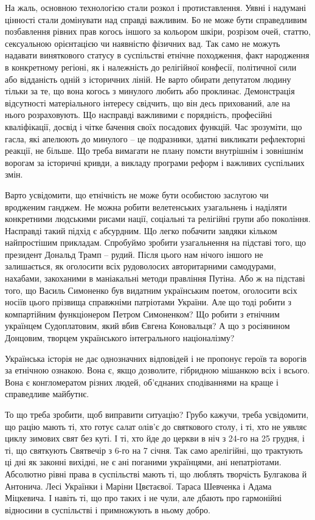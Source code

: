На жаль, основною технологією стали розкол і протиставлення. Уявні і надумані
цінності стали домінувати над справді важливим. Бо не може бути справедливим
позбавлення рівних прав когось іншого за кольором шкіри, розрізом очей, статтю,
сексуальною орієнтацією чи наявністю фізичних вад. Так само не можуть надавати
виняткового статусу в суспільстві етнічне походження, факт народження в
конкретному регіоні, як і належність до релігійної конфесії, політичної сили
або відданість одній з історичних ліній. Не варто обирати депутатом людину
тільки за те, що вона когось з минулого любить або проклинає. Демонстрація
відсутності матеріального інтересу свідчить, що він десь прихований, але на
нього розраховують. Що насправді важливими є порядність, професійні
кваліфікації, досвід і чітке бачення своїх посадових функцій. Час зрозуміти, що
гасла, які апелюють до минулого – це подразники, здатні викликати рефлекторні
реакції, не більше. Що треба вимагати не плану помсти внутрішнім і зовнішнім
ворогам за історичні кривди, а викладу програми реформ і важливих суспільних
змін.

Варто усвідомити, що етнічність не може бути особистою заслугою чи вродженим
ганджем. Не можна робити велетенських узагальнень і наділяти конкретними
людськими рисами нації, соціальні та релігійні групи або покоління. Насправді
такий підхід є абсурдним. Що легко побачити завдяки кільком найпростішим
прикладам. Спробуймо зробити узагальнення на підставі того, що президент
Дональд Трамп – рудий. Після цього нам нічого іншого не залишається, як
оголосити всіх рудоволосих авторитарними самодурами, нахабами, закоханими в
маніакальні методи правління Путіна. Або ж на підставі того, що Василь
Симоненко був видатним українським поетом, оголосити всіх носіїв цього прізвища
справжніми патріотами України. Але що тоді робити з компартійним функціонером
Петром Симоненком? Що робити з етнічним українцем Судоплатовим, який вбив
Євгена Коновальця? А що з росіянином Донцовим, творцем українського
інтегрального націоналізму?

Українська історія не дає однозначних відповідей і не пропонує героїв та
ворогів за етнічною ознакою. Вона є, якщо дозволите, гібридною мішанкою всіх і
всього. Вона є конгломератом різних людей, об’єднаних сподіваннями на краще і
справедливе майбутнє.

То що треба зробити, щоб виправити ситуацію? Грубо кажучи, треба усвідомити, що
рацію мають ті, хто готує салат олів’є до святкового столу, і ті, хто не уявляє
циклу зимових свят без куті. І ті, хто йде до церкви в ніч з 24-го на 25
грудня, і ті, що святкують Святвечір з 6-го на 7 січня. Так само арелігійні, що
трактують ці дні як законні вихідні, не є ані поганими українцями, ані
непатріотами. Абсолютно рівні права в суспільстві мають ті, що люблять
творчість Булгакова й Антонича. Лесі Українки і Маріни Цвєтаєвої. Тараса
Шевченка і Адама Міцкевича. І навіть ті, що про таких і не чули, але дбають про
гармонійні відносини в суспільстві і примножують в ньому добро.

